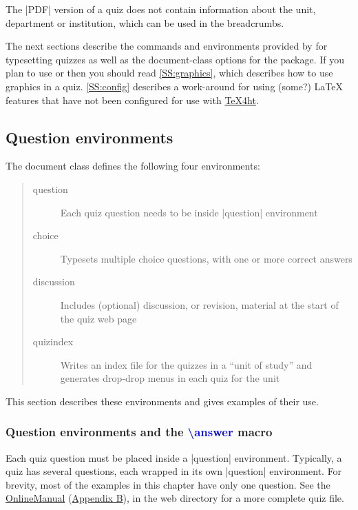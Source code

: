 \documentclass[svgnames]{article}
\newcommand\TeXfht{\href{https://www.ctan.org/tex4ht}{TeX4ht}\xspace}
\newcommand\OnlineManual{\href{http://www.maths.usyd.edu.au/u/mathas/WebQuiz/webquiz-online-manual.html}{OnlineManual} (\hyperref[S:online]{Appendix B})}
\begin{document}
    The \BashCode|PDF| version of a quiz does not contain information about
    the unit, department or institution, which can be used in the
    breadcrumbs.

    The next sections describe the commands and environments provided by
    \WebQuiz for typesetting quizzes as well as the document-class options
    for the package. If you plan to use  or
     then you should read \autoref{SS:graphics}, which
    describes how to use graphics in a \WebQuiz quiz.
    \autoref{SS:config} describes a work-around for using (some?) \LaTeX{}
    features that have not been configured for use with \TeXfht.

  \subsection{Question environments}

  The \WebQuiz document class defines the following four environments:
  \begin{quote}
    \begin{description}
      \item[question] Each quiz question needs to be inside
      \LatexCode|question| environment
      \item[choice] Typesets multiple choice questions, with
      one or more correct answers
      \item[discussion] Includes (optional) discussion, or revision,
      material at the start of the quiz web page
      \item[quizindex] Writes an index file for the quizzes in
      a ``unit of study'' and generates drop-drop menus in each quiz for
      the unit
    \end{description}
  \end{quote}
  This section describes these environments and gives examples
  of their use.

  \subsubsection{Question environments and the
         \textcolor{blue}{\textbackslash answer} macro}

  Each quiz question must be placed inside a \LatexCode|question|
  environment. Typically, a quiz has several questions, each wrapped in
  its own \LatexCode|question| environment.  For brevity, most of the
  examples in this chapter have only one question. See the
  \OnlineManual, in the \WebQuiz web directory for a more complete quiz
  file.
\end{document}
